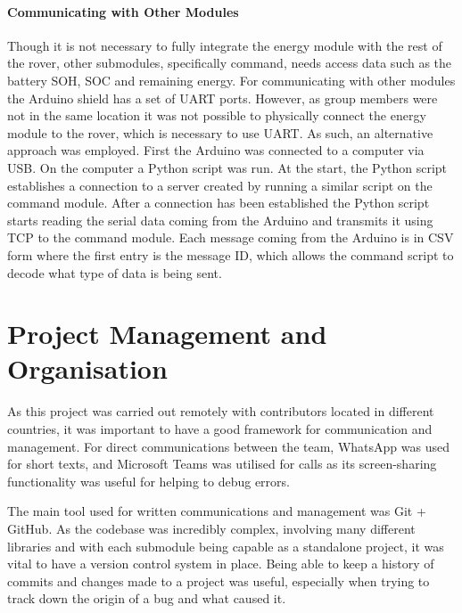 \documentclass[a4paper]{article}
\begin{document}
\paragraph*{Communicating with Other Modules}
\vspace{-6pt}
Though it is not necessary to fully integrate the energy module with 
the rest of the rover, other submodules, specifically command, needs 
access data such as the battery SOH, SOC and remaining energy. For 
communicating with other modules the Arduino shield has a set of 
UART ports. However, as group members were not in the same location 
it was not possible to physically connect the energy module to the 
rover, which is necessary to use UART. As such, an alternative 
approach was employed. First the Arduino was connected to a computer 
via USB. On the computer a Python script was run. At the start, the 
Python script establishes a connection to a server created by running 
a similar script on the command module. After a connection has been 
established the Python script starts reading the serial data coming 
from the Arduino and transmits it using TCP to the command module. 
Each message coming from the Arduino is in CSV form where the first 
entry is the message ID, which allows the command script to decode 
what type of data is being sent. 

\section{Project Management and Organisation}
As this project was carried out remotely
with contributors located in different countries, 
it was important to have a good framework for communication and management. 
For direct communications between the team, WhatsApp was used for short texts, 
and Microsoft Teams was utilised for calls as its screen-sharing functionality 
was useful for helping to debug errors. 

The main tool used for written communications and management was Git + GitHub.
As the codebase was incredibly complex, 
involving many different libraries and with each submodule being capable as a
standalone project, it was vital to have a version control system in place. 
Being able to keep a history of commits and changes made to a project was useful,
especially when trying to track down the origin of a bug and what caused it. 
\end{document}
